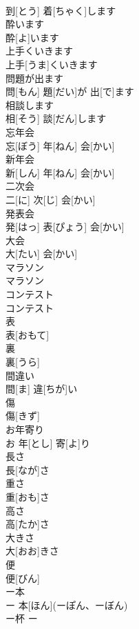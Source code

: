 \documentclass[8pt]{extreport}
\begin{document}
\begin{CJK}{UTF8}{min}
\\	到[とう] 着[ちゃく]します		
\\	酔います	
\\	酔[よ]います		
\\	上手くいきます	
\\	上手[うま]くいきます		
\\	問題が出ます	
\\	問[もん] 題[だい]が 出[で]ます		
\\	相談します	
\\	相[そう] 談[だん]します		
\\	忘年会	
\\	忘[ぼう] 年[ねん] 会[かい]		
\\	新年会	
\\	新[しん] 年[ねん] 会[かい]		
\\	二次会	
\\	二[に] 次[じ] 会[かい]		
\\	発表会	
\\	発[はっ] 表[ぴょう] 会[かい]		
\\	大会	
\\	大[たい] 会[かい]		
\\	マラソン	
\\	マラソン		
\\	コンテスト	
\\	コンテスト		
\\	表	
\\	表[おもて]		
\\	裏	
\\	裏[うら]		
\\	間違い	
\\	間[ま] 違[ちが]い		
\\	傷	
\\	傷[きず]		
\\	お年寄り	
\\	お 年[とし] 寄[よ]り		
\\	長さ	
\\	長[なが]さ		
\\	重さ	
\\	重[おも]さ		
\\	高さ	
\\	高[たか]さ		
\\	大きさ	
\\	大[おお]きさ		
\\	[ー]便	
\\	[ー] 便[びん]		
\\	ー本	
\\	ー 本[ほん](ーぽん、ーぼん)		
\\	ー杯	ー 

\end{CJK}
\end{document}
